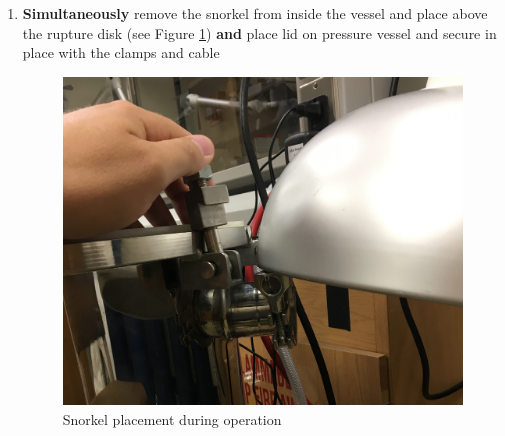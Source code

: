 \documentclass[letterpaper,11pt]{article}
\begin{document}
\begin{enumerate}
    
    \item \textbf{Simultaneously} remove the snorkel from inside the vessel and 
        place above the rupture 
        disk (see Figure \ref{fig:rupture_hood}) \textbf{and} place lid on 
        pressure vessel and secure in place with the clamps and cable

\begin{figure}[H]
\centering\includegraphics[width=.3\textwidth]{rupture_hood.jpg}
\caption{Snorkel placement during operation}
\label{fig:rupture_hood}
\end{figure} 


\end{enumerate}
\end{document}
